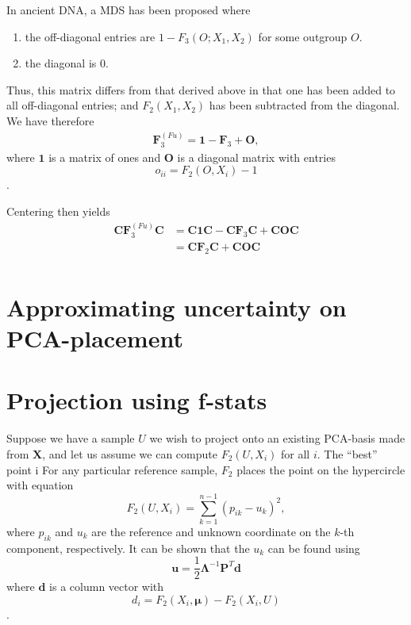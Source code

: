 \documentclass[10pt,a4paper]{article}
\newcommand{\MX}{\mathbf{X}} %
\newcommand{\MC}{\mathbf{C}} %
\newcommand{\MF}{\mathbf{F}_2} %
\newcommand{\MFT}{\mathbf{F}_3} %
\newcommand{\MP}{\mathbf{P}} %
\newcommand{\MEIGEN}{\mathbf{\Lambda}} %
\newcommand{\MEAN}{\boldsymbol{\mu}} %
\begin{document}
In ancient DNA, a MDS has been proposed where
\begin{enumerate}
	\item the off-diagonal entries are $1 - F_3(O; X_1, X_2)$ for some outgroup $O$.
	\item the diagonal is 0.
\end{enumerate}
Thus, this matrix differs from that derived above in that one has been added to all off-diagonal entries; and $F_2(X_1,X_2)$ has been subtracted from the diagonal. We have therefore
\begin{align}
\MFT^{(Fu)} = \mathbf{1} - \MFT + \mathbf{O},
\end{align}
where $\mathbf{1}$ is a matrix of ones and $\mathbf{O}$ is a diagonal matrix with entries
$$o_{ii} = F_2(O, X_i) -1$$.

Centering then yields
\begin{align}
\MC\MFT^{(Fu)}\MC &= \MC\mathbf{1}\MC - \MC\MFT\MC + \MC\mathbf{O}\MC\nonumber\\
                  &= \MC\MF\MC + \MC\mathbf{O}\MC\\
\end{align}




\section{Approximating uncertainty on PCA-placement}

\section{Projection using f-stats}
Suppose we have a sample $U$ we wish to project onto an existing PCA-basis made from $\MX$, and let us assume we can compute $F_2(U, X_i)$ for all $i$. The ``best'' point i
For any particular reference sample, $F_2$ places the point on the hypercircle with equation
\begin{equation}
F_2(U, X_i) = \sum_{k=1}^{n-1} (p_{ik} - u_k)^2,
\end{equation}
where $p_{ik}$ and $u_k$ are the reference and unknown coordinate on the $k$-th component, respectively. It can be shown \cite{gower1968} that the $u_k$ can be found using
\begin{equation}
\mathbf{u} = \frac{1}{2}\MEIGEN^{-1}\MP^T\mathbf{d}
\end{equation}
where $\mathbf{d}$ is a column vector with $$d_i = F_2(X_i, \MEAN) - F_2(X_i, U)$$.
\end{document}
